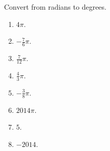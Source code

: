 Convert from radians to degrees.
\begin{multicols}{3}
\begin{enumerate}
\item $4\pi$.
\item $-\frac{7}{6}\pi$.
\item $\frac{7}{12}\pi$.
\item $\frac{4}{3}\pi$.
\item $-\frac{3}{8}\pi$.
\item $2014\pi$.
\item $5$.
\item $-2014$.
\end{enumerate}
\end{multicols}